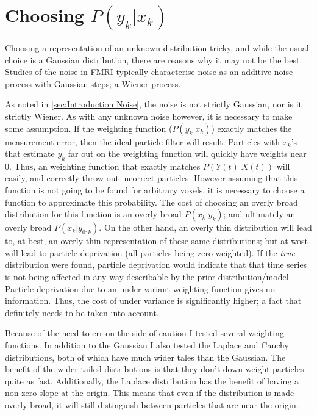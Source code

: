 \section{Choosing $P(y_k | x_k)$}
\label{sec:Methods Weighting Function}
Choosing a representation of an unknown distribution tricky, and while
the usual choice is a Gaussian distribution, there are reasons why it
may not be the best.  Studies of the noise in FMRI typically characterise
noise as an additive noise process with Gaussian steps; a Wiener process. 

As noted in \autoref{sec:Introduction Noise}, the noise is not strictly Gaussian,
nor is it strictly Wiener. As with any unknown noise however, it is necessary 
to make some assumption. If the weighting function ($P(y_k | x_k)$) exactly
matches the measurement error, then the ideal particle filter will result.
Particles with $x_k$'s that estimate $y_k$ far out on the weighting
function will quickly have weights near 0. Thus, an weighting function that
exactly matches $P(Y(t) | X(t))$ will easily, and correctly throw out incorrect
particles. However assuming that this function is not going to be found 
for arbitrary voxels, it is necessary to choose a function to approximate this 
probability. The cost of choosing an overly broad distribution for this
function is an overly broad $P(x_k | y_k)$; and ultimately an overly
broad $P(x_k | y_{0:k})$. On the other hand, an overly thin distribution
will lead to, at best, an overly thin representation of these same 
distributions; but at wost will lead to particle deprivation (all particles
being zero-weighted). If the \emph{true} distribution were found, particle
deprivation would indicate that that time series is not being affected
in any way describable by the prior distribution/model. Particle deprivation
due to an under-variant weighting function gives no information. Thus,
the cost of under variance is significantly higher; a fact that definitely needs
to be taken into account. 

Because of the need to err on the side of caution I tested several weighting
functions. In addition to the Gaussian I also tested the Laplace and Cauchy
distributions, both of which have much wider tales than the Gaussian. The
benefit of the wider tailed distributions is that they don't down-weight
particles quite as fast. Additionally, the Laplace distribution has the
benefit of having a non-zero slope at the origin. This means that even
if the distribution is made overly broad, it will still distinguish between
particles that are near the origin.

